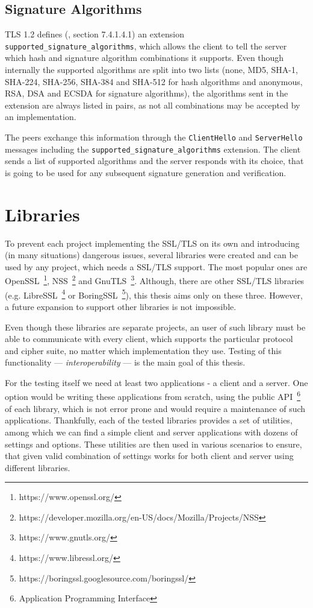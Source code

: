 \subsection{Signature Algorithms} \label{ref:signature-algorithms}
    TLS 1.2 defines (\cite{rfc5246}, section 7.4.1.4.1) an extension
    \texttt{supported\_signature\_algorithms}, which allows the client to tell
    the server which hash and signature algorithm combinations it supports.
    Even though internally the supported algorithms are split into two lists
    (none, MD5, SHA-1, SHA-224, SHA-256, SHA-384 and SHA-512 for hash algorithms
    and anonymous, RSA, DSA and ECSDA for signature algorithms), the algorithms
    sent in the extension are always listed in pairs, as not all combinations
    may be accepted by an implementation.

    The peers exchange this information through the \texttt{ClientHello} and
    \texttt{ServerHello} messages including the \texttt{supported\_signature\_algorithms}
    extension. The client sends a list of supported algorithms and the server
    responds with its choice, that is going to be used for any subsequent signature
    generation and verification.

\section{Libraries}
    To prevent each project implementing the SSL/TLS on its own and introducing
    (in many situations) dangerous issues, several libraries were created and
    can be used by any project, which needs a SSL/TLS support. The most
    popular ones are OpenSSL~\footnote{https://www.openssl.org/},
    NSS~\footnote{https://developer.mozilla.org/en-US/docs/Mozilla/Projects/NSS}
    and GnuTLS~\footnote{https://www.gnutls.org/}. Although, there are other
    SSL/TLS libraries (e.g. LibreSSL~\footnote{https://www.libressl.org/} or
    BoringSSL~\footnote{https://boringssl.googlesource.com/boringssl/}),
    this thesis aims only on these three. However, a future
    expansion to support other libraries is not impossible.

    Even though these libraries are
    separate projects, an user of such library must be able to communicate with every client,
    which supports the particular protocol and cipher suite, no matter which
    implementation they use. Testing of this functionality --- \textit{interoperability} ---
    is the main goal of this thesis.

    For the testing itself we need at least two applications - a client and a server.
    One option would be writing these applications from scratch, using the public
    API~\footnote{Application Programming Interface} of each library,
    which is not error prone and would require a maintenance of such applications.
    Thankfully, each of the tested libraries provides a set of utilities,
    among which we can find a simple client and server applications with
    dozens of settings and options. These utilities are then used in
    various scenarios to ensure, that given valid combination of settings works
    for both client and server using different libraries.

